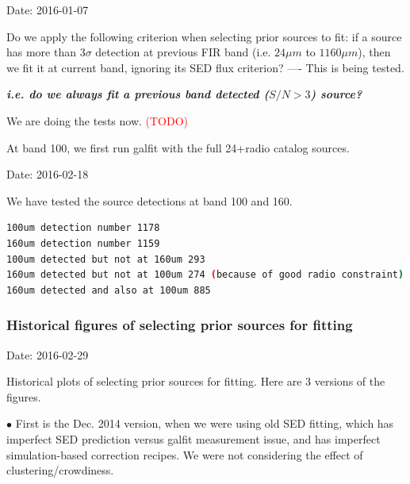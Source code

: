 \documentclass[11pt,a4paper]{article}
\begin{document}
\textcolor{green!90!black!60!orange}{Date: 2016-01-07}

Do we apply the following criterion when selecting prior sources to fit: if a source has more than $3\sigma$ detection at previous FIR band (i.e. $24{\mu}m$ to $1160{\mu}m$), then we fit it at current band, ignoring its SED flux criterion? ---- This is being tested. 

\textit{\textbf{i.e. do we always fit a previous band detected ($S/N>3$) source?}}

We are doing the tests now.
\textcolor{red}{(TODO)}

At band 100, we first run galfit with the full 24+radio catalog sources. 

\textcolor{green!90!black!60!orange}{Date: 2016-02-18}

We have tested the source detections at band 100 and 160. 
\begin{lstlisting}[language=bash]
100um detection number 1178
160um detection number 1159
100um detected but not at 160um 293
160um detected but not at 100um 274 (because of good radio constraint)
160um detected and also at 100um 885
\end{lstlisting}

\subsubsection{Historical figures of selecting prior sources for fitting}

\textcolor{green!90!black!60!orange}{Date: 2016-02-29}

Historical plots of selecting prior sources for fitting. Here are 3 versions of the figures. 

\indent\hspace{15pt}$\bullet$ 
First is the Dec. 2014 version, when we were using old SED fitting, which has imperfect SED prediction versus galfit measurement issue, and has imperfect simulation-based correction recipes. We were not considering the effect of clustering/crowdiness. 
\end{document}

